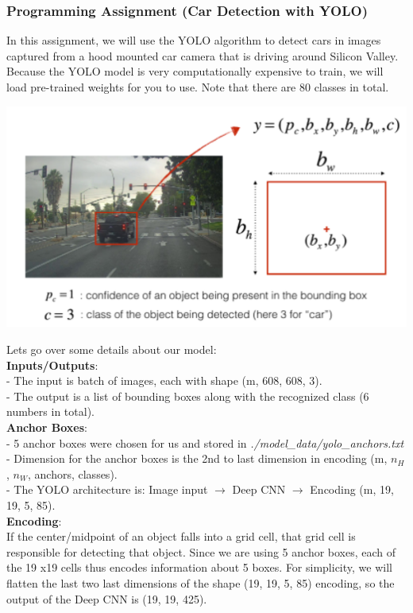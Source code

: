 \documentclass[11pt, a4paper]{article}
\begin{document}
\begin{spacing}{1.1}
	\subsubsection{Programming Assignment (Car Detection with YOLO)}
	In this assignment, we will use the YOLO algorithm to detect cars in images captured from a hood mounted car camera that is driving around Silicon Valley. Because the YOLO model is very computationally expensive to train, we will load pre-trained weights for you to use. Note that there are 80 classes in total.
	\begin{center}	\includegraphics[scale=.75]{car_hood} \end{center}
	Lets go over some details about our model: \vspace*{1mm}\\
	\textbf{Inputs/Outputs}:\\
	- The input is batch of images, each with shape (m, 608, 608, 3).\\
	- The output is a list of bounding boxes along with the recognized class (6 numbers in total). \vspace*{1mm}\\
	\textbf{Anchor Boxes}: \\
	- 5 anchor boxes were chosen for us and stored in \textit{./model\_data/yolo\_anchors.txt} \\
	- Dimension for the anchor boxes is the 2nd to last dimension in encoding (m, $n_H$, $n_W$, anchors, classes).\\
	- The YOLO architecture is: Image input $\rightarrow$ Deep CNN $\rightarrow$ Encoding (m, 19, 19, 5, 85). \vspace*{1mm}\\
	\textbf{Encoding}: \\
	If the center/midpoint of an object falls into a grid cell, that grid cell is responsible for detecting that object. Since we are using 5 anchor boxes, each of the 19 x19 cells thus encodes information about 5 boxes. For simplicity, we will flatten the last two last dimensions of the shape (19, 19, 5, 85) encoding, so the output of the Deep CNN is (19, 19, 425). 

\end{spacing}
\end{document}
